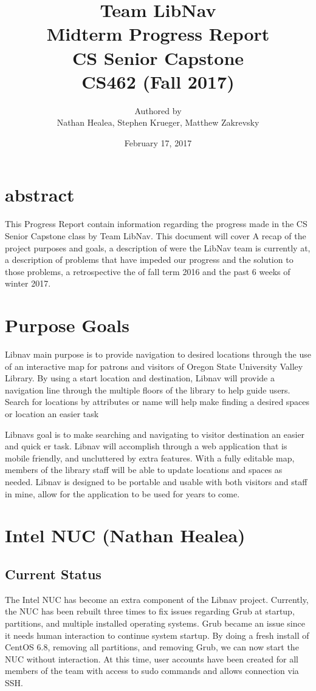 \documentclass[letterpaper,10pt,titlepage, onecolumn, compsoc]{IEEEtran}
\title{Team LibNav \\ Midterm Progress Report \\ CS Senior Capstone \\ \vspace{2mm}\small CS462 (Fall 2017)}
\author{Authored by \\ Nathan Healea, Stephen Krueger, Matthew Zakrevsky}
\date{February 17, 2017}
\begin{document}
\maketitle

\section*{abstract}
This Progress Report contain information regarding the progress made in the CS Senior Capstone class by Team LibNav. This document will cover A recap of the project purposes and goals, a description of were the LibNav team is currently at, a description of problems that have impeded our progress and the solution to those problems, a  retrospective the of fall term 2016 and the past 6 weeks of winter 2017.
\newpage

\tableofcontents
\newpage

\section{Purpose\/ Goals}
Libnav main purpose is to provide navigation to desired locations through the use of an interactive map for patrons and visitors of Oregon State University Valley Library. By using a start location and destination, Libnav will provide a navigation line through the multiple floors of the library to help guide users. Search for locations by attributes or name will help make finding a desired spaces or location an easier task 

Libnavs goal is to make searching and navigating to visitor destination an easier and quick er task. Libnav will accomplish through a web application that is mobile friendly, and uncluttered by extra features. With a fully editable map, members of the library staff will be able to update locations and spaces as needed.  Libnav is designed to be portable and usable with both visitors and staff in mine, allow for the application to be used for years to come. 

\section{Intel NUC (Nathan Healea)}
\subsection{Current Status}
The Intel NUC has become an extra component of the Libnav project. Currently, the NUC has been rebuilt three times to fix issues regarding Grub at startup, partitions, and multiple installed operating systems. Grub became an issue since it needs human interaction to continue system startup. By doing a fresh install of CentOS 6.8, removing all partitions, and removing Grub, we can now start the NUC without interaction. At this time, user accounts have been created for all members of the team with access to sudo commands and allows connection via SSH. 
\end{document}
